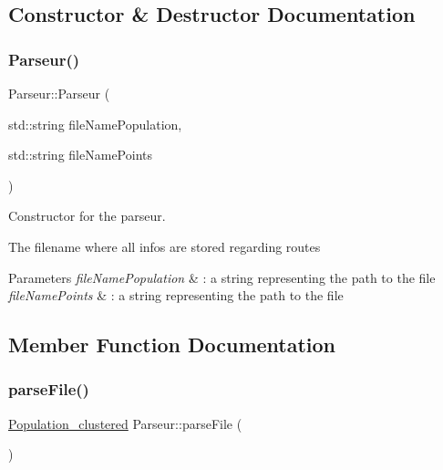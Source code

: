 \subsection{Constructor \& Destructor Documentation}
\mbox{\label{class_parseur_a32b67fd70e20c4c05f9a7587ffb1c99e}} 
\subsubsection{\texorpdfstring{Parseur()}{Parseur()}}
{\footnotesize\ttfamily Parseur\+::\+Parseur (\begin{DoxyParamCaption}\item[{std\+::string}]{file\+Name\+Population,  }\item[{std\+::string}]{file\+Name\+Points }\end{DoxyParamCaption})}



Constructor for the parseur. 

The filename where all infos are stored regarding routes


\begin{DoxyParams}{Parameters}
{\em file\+Name\+Population} & \+: a string representing the path to the file \\
\hline
{\em file\+Name\+Points} & \+: a string representing the path to the file \\
\hline
\end{DoxyParams}


\subsection{Member Function Documentation}
\mbox{\label{class_parseur_ab99d3dc36de4089ab266c1e69196fa55}} 
\subsubsection{\texorpdfstring{parse\+File()}{parseFile()}}
{\footnotesize\ttfamily \hyperlink{class_population__clustered}{Population\+\_\+clustered} Parseur\+::parse\+File (\begin{DoxyParamCaption}{ }\end{DoxyParamCaption})}



